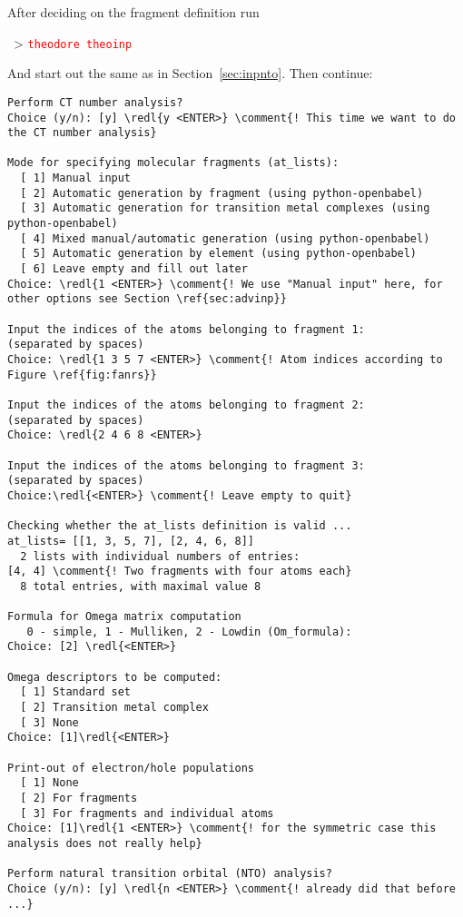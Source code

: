 \documentclass[DIV=12,headings=normal]{scrartcl}
\newcommand{\comment}[1]{\textcolor{blue}{#1}}
\newcommand{\redl}[1]{{\textcolor{red}{\texttt{#1}}}}
\newcommand{\comm}[1]{
\small
~> \redl{#1}
\normalsize
}
\newcounter{number}
\begin{document}
After deciding on the fragment definition run 

\comm{theodore theoinp}

And start out the same as in Section~\ref{sec:inpnto}. Then continue:

\scriptsize
\begin{Verbatim}[commandchars=\\\{\}]
Perform CT number analysis?
Choice (y/n): [y] \redl{y <ENTER>} \comment{! This time we want to do the CT number analysis}

Mode for specifying molecular fragments (at_lists):
  [ 1] Manual input
  [ 2] Automatic generation by fragment (using python-openbabel)
  [ 3] Automatic generation for transition metal complexes (using python-openbabel)
  [ 4] Mixed manual/automatic generation (using python-openbabel)
  [ 5] Automatic generation by element (using python-openbabel)
  [ 6] Leave empty and fill out later
Choice: \redl{1 <ENTER>} \comment{! We use "Manual input" here, for other options see Section \ref{sec:advinp}}

Input the indices of the atoms belonging to fragment 1:
(separated by spaces)
Choice: \redl{1 3 5 7 <ENTER>} \comment{! Atom indices according to Figure \ref{fig:fanrs}}

Input the indices of the atoms belonging to fragment 2:
(separated by spaces)
Choice: \redl{2 4 6 8 <ENTER>}

Input the indices of the atoms belonging to fragment 3:
(separated by spaces)
Choice:\redl{<ENTER>} \comment{! Leave empty to quit}

Checking whether the at_lists definition is valid ...
at_lists= [[1, 3, 5, 7], [2, 4, 6, 8]]
  2 lists with individual numbers of entries:
[4, 4] \comment{! Two fragments with four atoms each}
  8 total entries, with maximal value 8

Formula for Omega matrix computation
   0 - simple, 1 - Mulliken, 2 - Lowdin (Om_formula):
Choice: [2] \redl{<ENTER>}

Omega descriptors to be computed:
  [ 1] Standard set
  [ 2] Transition metal complex
  [ 3] None
Choice: [1]\redl{<ENTER>}

Print-out of electron/hole populations
  [ 1] None
  [ 2] For fragments
  [ 3] For fragments and individual atoms
Choice: [1]\redl{1 <ENTER>} \comment{! for the symmetric case this analysis does not really help}

Perform natural transition orbital (NTO) analysis?
Choice (y/n): [y] \redl{n <ENTER>} \comment{! already did that before ...}


\end{Verbatim}
\end{document}

